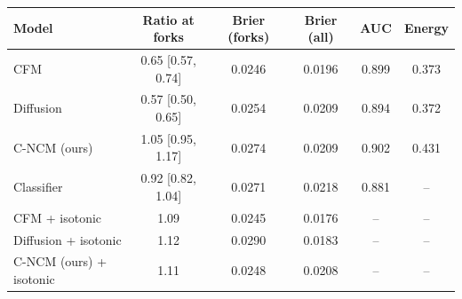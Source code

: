 \begin{tabular}{lccccc}
\toprule
Model & Ratio at forks & Brier (forks) & Brier (all) & AUC & Energy \\
\midrule
CFM & 0.65 [0.57, 0.74] & 0.0246 & 0.0196 & 0.899 & 0.373 \\
Diffusion & 0.57 [0.50, 0.65] & 0.0254 & 0.0209 & 0.894 & 0.372 \\
C-NCM (ours) & 1.05 [0.95, 1.17] & 0.0274 & 0.0209 & 0.902 & 0.431 \\
Classifier & 0.92 [0.82, 1.04] & 0.0271 & 0.0218 & 0.881 & -- \\
\midrule
CFM + isotonic & 1.09 & 0.0245 & 0.0176 & -- & -- \\
Diffusion + isotonic & 1.12 & 0.0290 & 0.0183 & -- & -- \\
C-NCM (ours) + isotonic & 1.11 & 0.0248 & 0.0208 & -- & -- \\
\bottomrule
\end{tabular}
